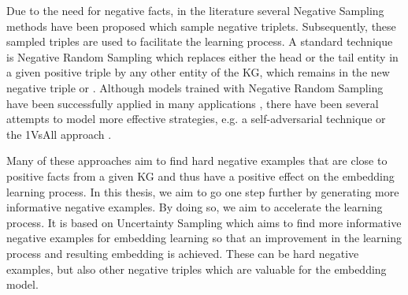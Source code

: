 Due to the need for negative facts, in the literature several Negative Sampling methods have been proposed which sample negative triplets.
Subsequently, these sampled triples are used to facilitate the learning process. 
A standard technique is Negative Random Sampling which replaces either the head or the tail entity in a given positive triple   by any other entity of the \ac{KG}, which remains in the new negative triple  or . 
Although models trained with Negative Random Sampling have been successfully applied in many applications \cite{TransE}, there have been several attempts to model more effective strategies, e.g. 
a self-adversarial technique \cite{RotatE} or the 1VsAll approach \cite{ConvE}.

Many of these approaches aim to find hard negative examples that are close to positive facts from a given \ac{KG} and thus have a positive effect on the embedding learning process. 
In this thesis, we aim to go one step further by generating more informative negative examples. 
By doing so, we aim to accelerate the learning process.
It is based on Uncertainty Sampling which aims to
find more informative negative examples for embedding learning so that an improvement in the learning process and resulting embedding is achieved.
These can be hard negative examples, but also other negative triples which are valuable for the embedding model.

